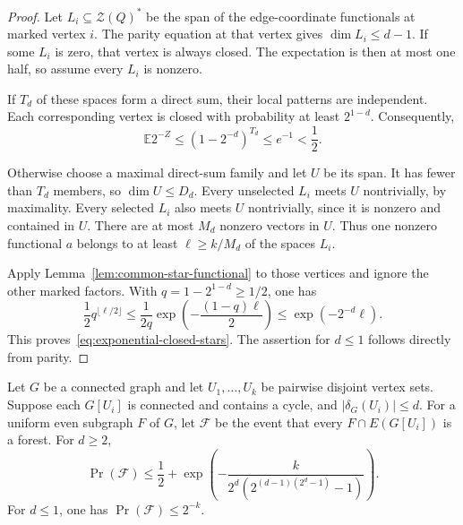 \begin{proof}
Let $L_i\subseteq\mathcal Z(Q)^*$ be the span of the edge-coordinate functionals at marked vertex $i$.
The parity equation at that vertex gives $\dim L_i\le d-1$.
If some $L_i$ is zero, that vertex is always closed.
The expectation is then at most one half, so assume every $L_i$ is nonzero.

If $T_d$ of these spaces form a direct sum, their local patterns are independent.
Each corresponding vertex is closed with probability at least $2^{1-d}$.
Consequently,
\[
 \mathbb E2^{-Z}\le(1-2^{-d})^{T_d}\le e^{-1}<\frac12.
\]

Otherwise choose a maximal direct-sum family and let $U$ be its span.
It has fewer than $T_d$ members, so $\dim U\le D_d$.
Every unselected $L_i$ meets $U$ nontrivially, by maximality.
Every selected $L_i$ also meets $U$ nontrivially, since it is nonzero and contained in $U$.
There are at most $M_d$ nonzero vectors in $U$.
Thus one nonzero functional $a$ belongs to at least $\ell\ge k/M_d$ of the spaces $L_i$.

Apply Lemma~\ref{lem:common-star-functional} to those vertices and ignore the other marked factors.
With $q=1-2^{1-d}\ge1/2$, one has
\[
 \frac12q^{\lfloor\ell/2\rfloor}
 \le\frac1{2q}\exp\!\left(-\frac{(1-q)\ell}{2}\right)
 \le\exp(-2^{-d}\ell).
\]
This proves~\eqref{eq:exponential-closed-stars}.
The assertion for $d\le1$ follows directly from parity.
\end{proof}

\begin{corollary}\label{cor:exponential-small-cuts}
Let $G$ be a connected graph and let $U_1,\ldots,U_k$ be pairwise disjoint vertex sets.
Suppose each $G[U_i]$ is connected and contains a cycle, and $|\delta_G(U_i)|\le d$.
For a uniform even subgraph $F$ of $G$, let $\mathcal F$ be the event that every $F\cap E(G[U_i])$ is a forest.
For $d\ge2$,
\[
 \Pr(\mathcal F)
 \le\frac12+\exp\!\left(-\frac{k}{2^d(2^{(d-1)(2^d-1)}-1)}\right).
\]
For $d\le1$, one has $\Pr(\mathcal F)\le2^{-k}$.
\end{corollary}

